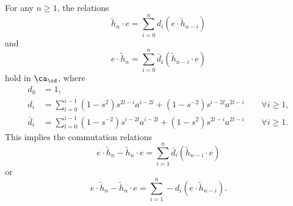 \begin{theorem} \label{prop:hncommutator}
For any $n \geq 1$, the relations
\begin{equation}
\tilde{h}_n \cdot e = \sum_{i=0}^n d_i (e \cdot \tilde{h}_{n-i})
\end{equation}
and
\begin{equation}
e \cdot \tilde{h}_n = \sum_{i=0}^n \bar{d}_i (\tilde{h}_{n-i} \cdot e)
\end{equation}
hold in $\ca_\cd$, where
\begin{align*}
d_0 & = 1, \\
d_i & = \sum_{l=0}^{i-1} (1 - s^2) s^{2l-i} a^{i-2l} + (1 - s^{-2}) s^{i-2l} a^{2l-i} \qquad \forall i \geq 1, \\
\bar{d}_i & = \sum_{l=0}^{i-1} (1 - s^{-2}) s^{i-2l} a^{i-2l} + (1 - s^{2}) s^{2l-i} a^{2l-i} \qquad \forall i \geq 1.
\end{align*}
This implies the commutation relations
\begin{equation}
e \cdot \tilde{h}_n - \tilde{h}_n \cdot e = \sum_{i=1}^n \bar{d}_i (\tilde{h}_{n-i} \cdot e)
\end{equation}
or 
\begin{equation}
e \cdot \tilde{h}_n - \tilde{h}_n \cdot e = \sum_{i=1}^n - d_i (e \cdot \tilde{h}_{n-i}).
\end{equation}
\end{theorem}
